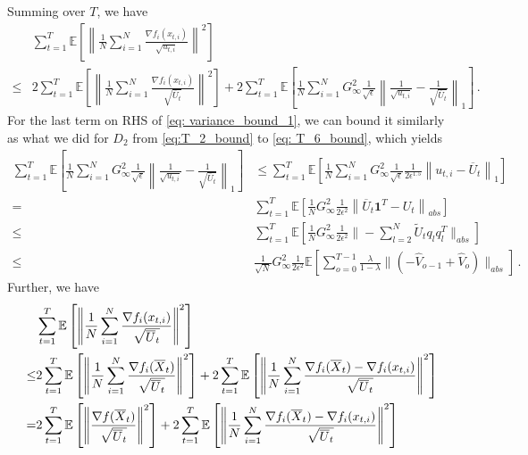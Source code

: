 \documentclass[11pt]{article}
\begin{document}
Summing over $T$, we have
\begin{align}\label{eq: variance_bound_1}
&\sum_{t=1}^T \mathbb E \left[  \left\| \frac{1}{N} \sum_{i=1}^N \frac{\nabla f_i(x_{t,i})}{\sqrt{u_{t,i}}} \right\|^2     \right]   \nonumber \\
\leq & 2\sum_{t=1}^T \mathbb E \left[  \left\|\frac{1}{N} \sum_{i=1}^N \frac{\nabla f_i(x_{t,i})}{\sqrt{\overline U_t}  } \right\|^2 \right] + 2 \sum_{t=1}^T \mathbb E \left[  \frac{1}{N} \sum_{i=1}^N G_{\infty}^2  \frac{1}{\sqrt{\epsilon}}\left\|     \frac{1}{\sqrt{u_{t,i}}} - \frac{1}{\sqrt{\overline U_{t}}}  \right\|_1     \right] \, .
\end{align}
For the last term on RHS of \eqref{eq: variance_bound_1}, we can bound it similarly as what we did for $D_2$ from \eqref{eq:T_2_bound} to \eqref{eq: T_6_bound}, which yields
\begin{align}\label{eq: diff_u}
\sum_{t=1}^T \mathbb E \left[  \frac{1}{N} \sum_{i=1}^N G_{\infty}^2  \frac{1}{\sqrt{\epsilon}}\left\|     \frac{1}{\sqrt{u_{t,i}}} - \frac{1}{\sqrt{\overline U_{t}}}  \right\|_1     \right]&  \leq  \sum_{t=1}^T \mathbb E \left[  \frac{1}{N} \sum_{i=1}^N G_{\infty}^2  \frac{1}{\sqrt{\epsilon}} \frac{1}{2\epsilon^{1.5}} \left\|  u_{t,i} -    \overline U_{t}  \right\|_1     \right] \nonumber \\
=& \sum_{t=1}^T \mathbb E \left[  \frac{1}{N}  G_{\infty}^2 \frac{1}{2\epsilon^2} \left\|     \overline U_{t} \mathbf 1^T - U_{t}  \right\|_{abs}    \right]  \nonumber \\
\leq & \sum_{t=1}^T \mathbb E \left[  \frac{1}{N}  G_{\infty}^2 \frac{1}{2\epsilon^2} \| - \sum_{l=2}^N   \tilde U_t q_l q_l^T \|_{abs}    \right] \nonumber \\ 
\leq & \frac{1}{\sqrt{N}}  G_{\infty}^2 \frac{1}{2\epsilon^2}   \mathbb E \left[   \sum_{o=0}^{T-1} \frac{\lambda}{1-\lambda}     \|    (- \hat V_{o-1} + \hat V_{o} ) \|_{abs}    \right] \, .
\end{align}
Further, we have 
\begin{align}\notag
\begin{split}
&\sum_{t=1}^T \mathbb E \left[  \left\|\frac{1}{N} \sum_{i=1}^N \frac{\nabla f_i(x_{t,i})}{\sqrt{\overline U_t}  } \right\|^2 \right]   \\
\leq & 2 \sum_{t=1}^T \mathbb E \left[  \left\|\frac{1}{N} \sum_{i=1}^N \frac{\nabla f_i(\overline X_{t})}{\sqrt{\overline U_t}  } \right\|^2 \right] + 2 \sum_{t=1}^T \mathbb E \left[  \left\|\frac{1}{N} \sum_{i=1}^N \frac{\nabla f_i(\overline X_t) - \nabla f_i(x_{t,i})}{\sqrt{\overline U_t}  } \right\|^2 \right]  \\
= & 2 \sum_{t=1}^T \mathbb E \left[  \left\| \frac{\nabla f(\overline X_{t})}{\sqrt{\overline U_t}  } \right\|^2 \right] + 2 \sum_{t=1}^T \mathbb E \left[  \left\|\frac{1}{N} \sum_{i=1}^N \frac{\nabla f_i(\overline X_t) - \nabla f_i(x_{t,i})}{\sqrt{\overline U_t}  } \right\|^2 \right] 
\end{split}
\end{align}
\end{document}

